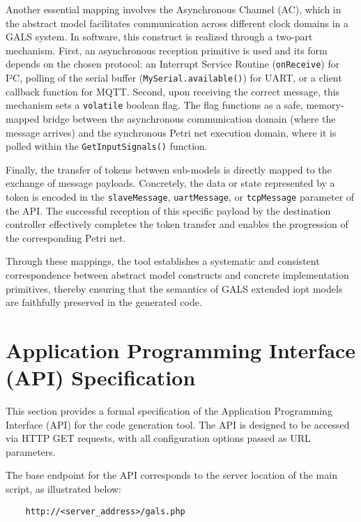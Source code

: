 Another essential mapping involves the Asynchronous Channel (AC), which in the abstract model facilitates communication across different clock domains in a GALS system. In software, this construct is realized through a two-part mechanism. First, an asynchronous reception primitive is used and its form depends on the chosen protocol: an Interrupt Service Routine (\texttt{onReceive}) for I²C, polling of the serial buffer (\texttt{MySerial.available()}) for UART, or a client callback function for MQTT. Second, upon receiving the correct message, this mechanism sets a \texttt{volatile} boolean flag. The flag functions as a safe, memory-mapped bridge between the asynchronous communication domain (where the message arrives) and the synchronous Petri net execution domain, where it is polled within the \texttt{GetInputSignals()} function.

Finally, the transfer of tokens between sub-models is directly mapped to the exchange of message payloads. Concretely, the data or state represented by a token is encoded in the \texttt{slaveMessage}, \texttt{uartMessage}, or \texttt{tcpMessage} parameter of the API. The successful reception of this specific payload by the destination controller effectively completes the token transfer and enables the progression of the corresponding Petri net.

Through these mappings, the tool establishes a systematic and consistent correspondence between abstract model constructs and concrete implementation primitives, thereby ensuring that the semantics of GALS extended \gls{iopt} models are faithfully preserved in the generated code.



\section{Application Programming Interface (API) Specification}
\label{sec:api_spec}

This section provides a formal specification of the Application Programming Interface (API) for the code generation tool. The API is designed to be accessed via HTTP GET requests, with all configuration options passed as URL parameters.

The base endpoint for the API corresponds to the server location of the main script, as illustrated below:
\begin{verbatim}
    http://<server_address>/gals.php
\end{verbatim}

